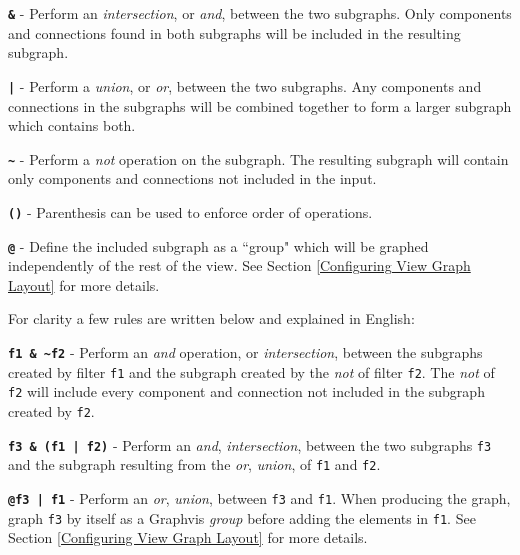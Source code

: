 \vspace{5mm} %
\begin{spaceditemize}
  \item \textbf{\texttt{\&}} - Perform an \textit{intersection}, or \textit{and}, between the two subgraphs. Only components and connections found in both subgraphs will be included in the resulting subgraph.
  \item \textbf{\texttt{|}} - Perform a \textit{union}, or \textit{or}, between the two subgraphs. Any components and connections in the subgraphs will be combined together to form a larger subgraph which contains both.
  \item \textbf{\texttt{\textasciitilde{}}} - Perform a \textit{not} operation on the subgraph. The resulting subgraph will contain only components and connections not included in the input.
  \item \textbf{\texttt{()}} - Parenthesis can be used to enforce order of operations.
  \item \textbf{\texttt{@}} - Define the included subgraph as a ``group" which will be graphed independently of the rest of the view. See Section \ref{Configuring View Graph Layout} for more details.
\end{spaceditemize}
\vspace{5mm} %

For clarity a few rules are written below and explained in English:

\vspace{5mm} %
\begin{spaceditemize}
  \item \textbf{\texttt{f1 \& \textasciitilde{}f2}} - Perform an \textit{and} operation, or \textit{intersection}, between the subgraphs created by filter \texttt{f1} and the subgraph created by the \textit{not} of filter \texttt{f2}. The \textit{not} of \texttt{f2} will include every component and connection not included in the subgraph created by \texttt{f2}.
  \item \textbf{\texttt{f3 \& (f1 | f2)}} - Perform an \textit{and}, \textit{intersection}, between the two subgraphs \texttt{f3} and the subgraph resulting from the \textit{or}, \textit{union}, of \texttt{f1} and \texttt{f2}.
  \item \textbf{\texttt{@f3 | f1}} - Perform an \textit{or}, \textit{union}, between \texttt{f3} and \texttt{f1}. When producing the graph, graph \texttt{f3} by itself as a Graphvis \textit{group} before adding the elements in \texttt{f1}. See Section \ref{Configuring View Graph Layout} for more details.
\end{spaceditemize}
\vspace{5mm} %

